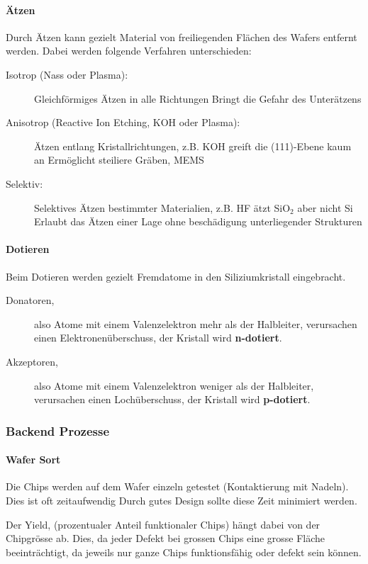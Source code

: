 \paragraph{Ätzen}
Durch Ätzen kann gezielt Material von freiliegenden Flächen des Wafers entfernt werden.
Dabei werden folgende Verfahren unterschieden:
\begin{description}
    \item[Isotrop (Nass oder Plasma):] Gleichförmiges Ätzen in alle Richtungen \rightarrow Bringt die Gefahr des Unterätzens
    \item[Anisotrop (Reactive Ion Etching, KOH oder Plasma):] Ätzen entlang Kristallrichtungen, z.B. KOH greift die (111)-Ebene kaum an \rightarrow Ermöglicht steiliere Gräben, MEMS
    \item[Selektiv:] Selektives Ätzen bestimmter Materialien, z.B. HF ätzt SiO$_2$ aber nicht Si \\
        \rightarrow Erlaubt das Ätzen einer Lage ohne beschädigung unterliegender Strukturen
\end{description}

\paragraph{Dotieren}
Beim Dotieren werden gezielt Fremdatome in den Siliziumkristall eingebracht.
\begin{description}
    \item[Donatoren,] also Atome mit einem Valenzelektron mehr als der Halbleiter, verursachen einen Elektronenüberschuss, der Kristall wird \textbf{n-dotiert}.
    \item[Akzeptoren,] also Atome mit einem Valenzelektron weniger als der Halbleiter, verursachen einen Lochüberschuss, der Kristall wird \textbf{p-dotiert}.
\end{description}


\subsubsection{Backend Prozesse}

\paragraph{Wafer Sort}
Die Chips werden auf dem Wafer einzeln getestet (Kontaktierung mit Nadeln). 
Dies ist oft zeitaufwendig \rightarrow Durch gutes Design sollte diese Zeit minimiert werden.

Der Yield, (prozentualer Anteil funktionaler Chips) hängt dabei von der Chipgrösse ab.
Dies, da jeder Defekt bei grossen Chips eine grosse Fläche beeinträchtigt, da jeweils nur ganze Chips funktionsfähig oder defekt sein können.

